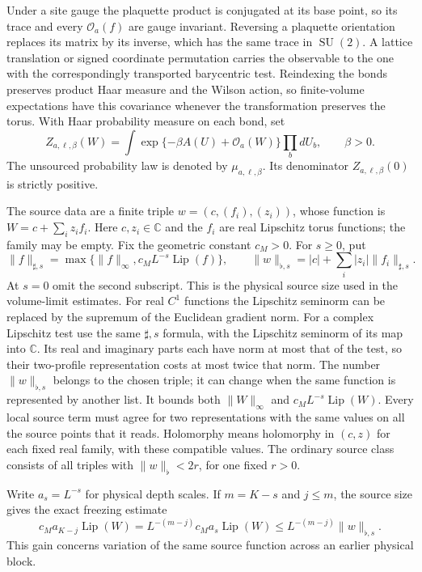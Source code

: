 \documentclass[11pt,letterpaper,reqno]{amsart}
\numberwithin{equation}{section}
\theoremstyle{definition}
\theoremstyle{remark}
\begin{document}
Under a site gauge the plaquette product is conjugated at its
base point, so its trace and every $\mathcal O_a(f)$ are gauge
invariant. Reversing a plaquette orientation replaces its matrix
by its inverse, which has the same trace in $\operatorname{SU}(2)$.
A lattice translation or signed coordinate permutation carries
the observable to the one with the correspondingly transported
barycentric test. Reindexing the bonds preserves product Haar
measure and the Wilson action, so finite-volume expectations have
this covariance whenever the transformation preserves the torus.
With Haar probability measure on each bond, set
\[
 Z_{a,\ell,\beta}(W)
   =\int \exp\{-\beta A(U)+\mathcal O_a(W)\}\prod_b dU_b,
 \qquad \beta>0.
\]
The unsourced probability law is denoted by $\mu_{a,\ell,\beta}$.
Its denominator $Z_{a,\ell,\beta}(0)$ is strictly positive.

The source data are a finite triple $w=(c,(f_i),(z_i))$, whose
function is $W=c+\sum_i z_i f_i$. Here $c,z_i\in\mathbb C$ and
the $f_i$ are real Lipschitz torus functions; the family may be
empty. Fix the geometric constant $c_M>0$. For $s\ge0$, put
\begin{equation}\label{si:eq-source-norm}
 \|f\|_{\sharp,s}=\max\{\|f\|_\infty,c_M L^{-s}\operatorname{Lip}(f)\},
 \qquad
 \|w\|_{\flat,s}=|c|+\sum_i|z_i|\|f_i\|_{\sharp,s}.
\end{equation}
At $s=0$ omit the second subscript. This is the physical source
size used in the volume-limit estimates.
For real $C^1$ functions the Lipschitz seminorm can be replaced by
the supremum of the Euclidean gradient norm. For a complex
Lipschitz test use the same $\sharp,s$ formula, with the
Lipschitz seminorm of its map into $\mathbb C$. Its real and
imaginary parts each have norm at most that of the test, so
their two-profile representation costs at most twice that norm.
The number
$\|w\|_{\flat,s}$ belongs to the chosen triple; it can change when
the same function is represented by another list. It bounds both
$\|W\|_\infty$ and $c_M L^{-s}\operatorname{Lip}(W)$.
Every local source term must agree for two representations with
the same values on all the source points that it reads.
Holomorphy means holomorphy in $(c,z)$ for each fixed real family,
with these compatible values. The ordinary source class consists
of all triples with $\|w\|_\flat<2r$, for one fixed $r>0$.

Write $a_s=L^{-s}$ for physical depth scales. If $m=K-s$ and
$j\le m$, the source size gives the exact freezing estimate
\begin{equation}\label{si:eq-source-freezing-scale}
 c_M a_{K-j}\operatorname{Lip}(W)
   =L^{-(m-j)}c_M a_s\operatorname{Lip}(W)
   \le L^{-(m-j)}\|w\|_{\flat,s}.
\end{equation}
This gain concerns variation of the same source function across
an earlier physical block.
\end{document}
